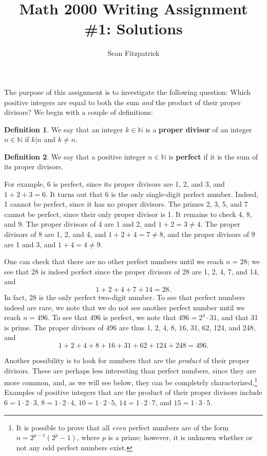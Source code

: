\documentclass[letterpaper,12pt]{article}
\title{Math 2000 Writing Assignment \#1: Solutions}
\author{Sean Fitzpatrick}
\theoremstyle{definition}
\newtheorem{definition}{Definition}
\newcommand{\N}{\mathbb{N}}
\begin{document}
 \maketitle

The purpose of this assignment is to investigate the following question: Which positive integers are equal to both the sum {\em and} the product of their proper divisors? We begin with a couple of definitions:
\begin{definition}
 We say that an integer $k\in\N$ is a {\bf proper divisor} of an integer $n\in\N$ if $k|n$ and $k\neq n$.
\end{definition}
\begin{definition}
 We say that a positive integer $n\in\N$ is {\bf perfect} if it is the sum of its proper divisors.
\end{definition}
For example, 6 is perfect, since its proper divisors are 1, 2, and 3, and $1+2+3=6$. It turns out that 6 is the only single-digit perfect number. Indeed, 1 cannot be perfect, since it has no proper divisors. The primes 2, 3, 5, and 7 cannot be perfect, since their only proper divisor is 1. It remains to check 4, 8, and 9. The proper divisors of 4 are 1 and 2, and $1+2=3\neq 4$. The proper divisors of 8 are 1, 2, and 4, and $1+2+4=7\neq 8$, and the proper divisors of 9 are 1 and 3, and $1+4=4\neq 9$.

One can check that there are no other perfect numbers until we reach $n=28$; we see that 28 is indeed perfect since the proper divisors of 28 are 1, 2, 4, 7, and 14, and
\[
 1+2+4+7+14 = 28.
\]
In fact, 28 is the only perfect two-digit number. To see that perfect numbers indeed are rare, we note that we do not see another perfect number until we reach $n=496$. To see that 496 is perfect, we note that $496 = 2^4\cdot 31$, and that 31 is prime. The proper divisors of 496 are thus 1, 2, 4, 8, 16, 31, 62, 124, and 248, and
\[
 1+2+4+8+16+31+62+124+248 = 496.
\]

Another possibility is to look for numbers that are the {\em product} of their proper divisors. These are perhaps less interesting than perfect numbers, since they are more common, and, as we will see below, they can be completely characterized.\footnote{It is possible to prove that all {\em even} perfect numbers are of the form $n=2^{p-1}(2^p-1)$, where $p$ is a prime; however, it is unknown whether or not any odd perfect numbers exist.} Examples of positive integers that are the product of their proper divisors include $6=1\cdot 2\cdot 3$, $8=1\cdot 2\cdot 4$, $10 = 1\cdot 2\cdot 5$, $14 = 1\cdot 2\cdot 7$, and $15=1\cdot 3\cdot 5$.
\end{document}
